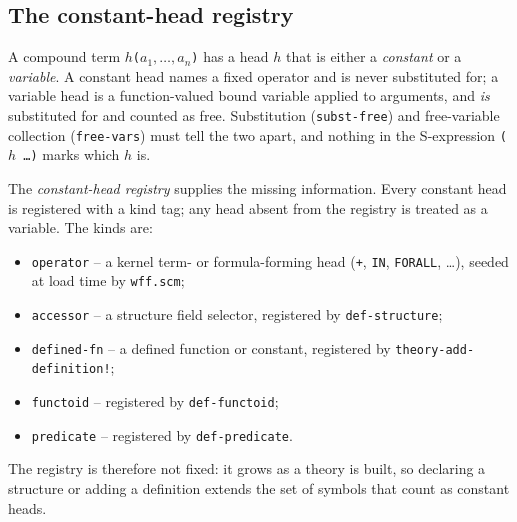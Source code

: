 \subsection{The constant-head registry}
\label{sec:constant-registry}

A compound term \texttt{$h$($a_1,\ldots,a_n$)} has a head $h$ that is
either a \emph{constant} or a \emph{variable}.  A constant head names a
fixed operator and is never substituted for; a variable head is a
function-valued bound variable applied to arguments, and \emph{is}
substituted for and counted as free.  Substitution (\texttt{subst-free})
and free-variable collection (\texttt{free-vars}) must tell the two
apart, and nothing in the S-expression \texttt{($h$ \ldots)} marks which
$h$ is.

The \emph{constant-head registry} supplies the missing information.
Every constant head is registered with a kind tag; any head absent from
the registry is treated as a variable.  The kinds are:
\begin{itemize}
\item \texttt{operator} -- a kernel term- or formula-forming head
  (\texttt{+}, \texttt{IN}, \texttt{FORALL}, \ldots), seeded at load
  time by \texttt{wff.scm};
\item \texttt{accessor} -- a structure field selector, registered by
  \texttt{def-structure};
\item \texttt{defined-fn} -- a defined function or constant, registered
  by \texttt{theory-add-definition!};
\item \texttt{functoid} -- registered by \texttt{def-functoid};
\item \texttt{predicate} -- registered by \texttt{def-predicate}.
\end{itemize}
The registry is therefore not fixed: it grows as a theory is built, so
declaring a structure or adding a definition extends the set of symbols
that count as constant heads.

